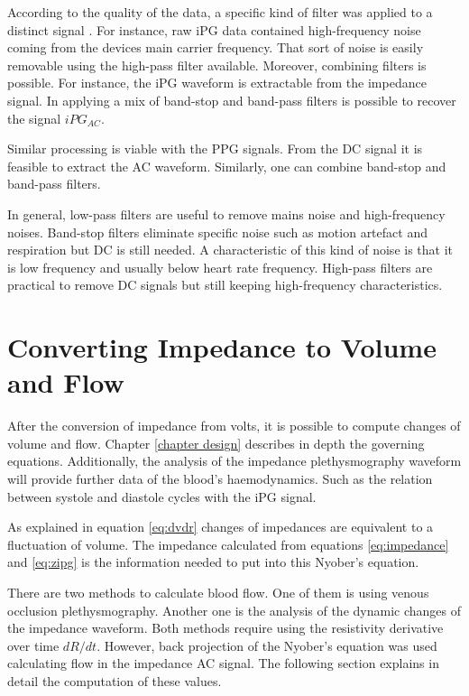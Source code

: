 According to the quality of the data, a specific kind of filter was applied to a distinct signal . For instance, raw iPG data contained high-frequency noise coming from the devices main carrier frequency. That sort of noise is easily removable using the high-pass filter available. Moreover, combining filters is possible. For instance, the iPG waveform is extractable from the impedance signal. In applying a mix of band-stop and band-pass filters is possible to recover the signal $iPG_{AC}$.

Similar processing is viable with the PPG signals. From the DC signal it is feasible to extract the AC waveform. Similarly, one can combine band-stop and band-pass filters.

In general, low-pass filters are useful to remove mains noise and high-frequency noises. Band-stop filters eliminate specific noise such as motion artefact and respiration but DC is still needed. A characteristic of this kind of noise is that it is low frequency and usually below heart rate frequency. High-pass filters are practical to remove DC signals but still keeping high-frequency characteristics.


\section{Converting Impedance to Volume and Flow}
\label{section procedure 4}

After the conversion of impedance from volts, it is possible to compute changes of volume and flow. Chapter \ref{chapter design} describes in depth the governing equations. Additionally, the analysis of the impedance plethysmography waveform will provide further data of the blood's haemodynamics. Such as the relation between systole and diastole cycles with the iPG signal.

As explained in equation \ref{eq:dvdr} changes of impedances are equivalent to a fluctuation of volume.  The impedance calculated from equations \ref{eq:impedance} and \ref{eq:zipg} is the information needed to put into this Nyober's equation.

There are two methods to calculate blood flow. One of them is using venous occlusion plethysmography. Another one is the analysis of the dynamic changes of the impedance waveform. Both methods require using the resistivity derivative over time $dR/dt$. However, back projection of the Nyober's equation was used calculating flow in the impedance AC signal. The following section explains in detail the computation of these values.  

